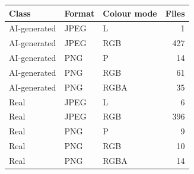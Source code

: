 \begin{tabular}{lllr}
\toprule
\textbf{Class} & \textbf{Format} & \textbf{Colour mode} & \textbf{Files} \\
\midrule
AI-generated & JPEG & L & 1 \\
AI-generated & JPEG & RGB & 427 \\
AI-generated & PNG & P & 14 \\
AI-generated & PNG & RGB & 61 \\
AI-generated & PNG & RGBA & 35 \\
Real & JPEG & L & 6 \\
Real & JPEG & RGB & 396 \\
Real & PNG & P & 9 \\
Real & PNG & RGB & 10 \\
Real & PNG & RGBA & 14 \\
\bottomrule
\end{tabular}
